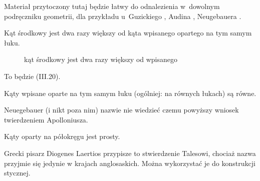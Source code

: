 
Materiał przytoczony tutaj będzie łatwy do odnalezienia w~dowolnym podręczniku geometrii, dla przykładu u~Guzickiego \cite[s. 11-13, 18, 19]{guzicki_2021}, Audina \cite[s. 74, 75]{audin_2003}, Neugebauera \cite[s. 22, 23]{neugebauer_2018}.

\begin{proposition}
%
%
    Kąt środkowy jest dwa razy większy od kąta wpisanego opartego na tym samym łuku.
\begin{figure}[H]\centering%
\begin{comment}
\begin{tikzpicture}[scale=.35]
    \tkzDefPoint(0, 0){Zero}
    \tkzDefPoint(100:5){A}
    \tkzDefPoint(100:3.5){Aa}
    \tkzDefPoint(230:5){B}
    \tkzDefPoint(285:1.5){Oo}
    \tkzDefPoint(340:5){C}
    \tkzDrawCircle[line width=0.5mm](Zero,A)
    \tkzLabelPoint[above left](Zero){$O$}
    \tkzLabelPoint[above](A){$A$}
    \tkzLabelPoint[below left](B){$B$}
    \tkzLabelPoint[below right](C){$C$}
    \tkzDrawPolygons[line width=0.3mm](A,B,Zero,C)
    \tkzMarkAngle(B,Zero,C)
    \tkzMarkAngle(B,A,C)
    \tkzDrawPoints[size=3,color=black,fill=red!50](A,B,C,Zero)
    \tkzLabelPoint[anchor=center](Aa){$\alpha$}
    \tkzLabelPoint[anchor=center](Oo){$2\alpha$}
\end{tikzpicture}
\end{comment}
    \caption{kąt środkowy jest dwa razy większy od wpisanego}
\end{figure}
\end{proposition}

To będzie (III.20).

\begin{corollary}
    Kąty wpisane oparte na tym samym łuku (ogólniej: na równych łukach) są równe.
\end{corollary}

Neuegebauer (i nikt poza nim) nazwie nie wiedzieć czemu powyższy wniosek twierdzeniem Apolloniusza.

\begin{corollary}
    Kąty oparty na półokręgu jest prosty.
\end{corollary}

Grecki pisarz Diogenes Laertios przypisze to stwierdzenie Talesowi, chociaż nazwa przyjmie się jedynie w krajach anglosaskich.
%
%
Można wykorzystać je do konstrukcji stycznej.
%

